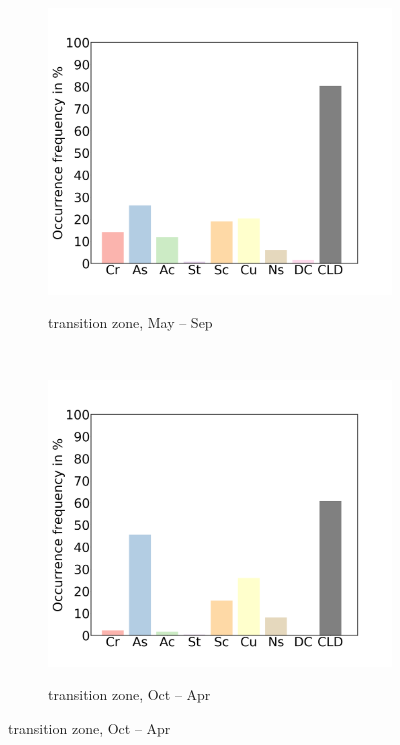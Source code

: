 \documentclass[alpha-refs]{wiley-article}
\begin{document}
\begin{figure}[!htbp]
    \begin{subfigure}[b]{0.5\textwidth}
        \centering
        \caption{transition zone, May -- Sep }        
        \includegraphics[width=\textwidth]{cld_type_freq_transitionzone_monsoonseason.png}
        \label{fig:cld_type5}
        \end{subfigure}
        ~ 
        \begin{subfigure}[b]{0.5\textwidth}
        \centering
        \caption{transition zone, Oct -- Apr }        
        \includegraphics[width=\textwidth]{cld_type_freq_transitionzone_westerlyseason.png}
        \label{fig:cld_type6}
        \end{subfigure}
        \end{figure}
        
\end{document}
